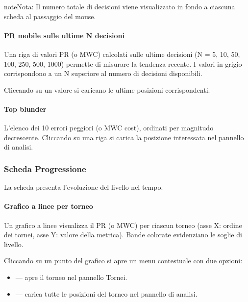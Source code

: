 \documentclass[letterpaper,10pt,italian]{sphinxmanual}
\begin{document}
\begin{sphinxadmonition}{note}{Nota:}
\sphinxAtStartPar
Il numero totale di decisioni viene visualizzato in fondo a ciascuna scheda al passaggio del mouse.
\end{sphinxadmonition}


\paragraph{PR mobile sulle ultime N decisioni}
\label{\detokenize{manuel:pr-glissant-sur-n-dernieres-decisions}}
\sphinxAtStartPar
Una riga di valori PR (o MWC) calcolati sulle ultime  decisioni (N = 5, 10, 50, 100, 250, 500, 1000) permette di misurare la tendenza recente. I valori in grigio corrispondono a un N superiore al numero di decisioni disponibili.

\sphinxAtStartPar
Cliccando su un valore si caricano le ultime  posizioni corrispondenti.


\paragraph{Top blunder}
\label{\detokenize{manuel:top-blunders}}
\sphinxAtStartPar
L’elenco dei 10 errori peggiori (o MWC cost), ordinati per magnitudo decrescente. Cliccando su una riga si carica la posizione interessata nel pannello di analisi.


\subsubsection{Scheda Progressione}
\label{\detokenize{manuel:onglet-progression}}
\sphinxAtStartPar
La scheda  presenta l’evoluzione del livello nel tempo.


\paragraph{Grafico a linee per torneo}
\label{\detokenize{manuel:courbe-par-tournoi}}
\sphinxAtStartPar
Un grafico a linee visualizza il PR (o MWC) per ciascun torneo (asse X: ordine dei tornei, asse Y: valore della metrica). Bande colorate evidenziano le soglie di livello.

\sphinxAtStartPar
Cliccando su un punto del grafico si apre un menu contestuale con due opzioni:
\begin{itemize}
\item {} 
\sphinxAtStartPar
{} — apre il torneo nel pannello Tornei.

\item {} 
\sphinxAtStartPar
{} — carica tutte le posizioni del torneo nel pannello di analisi.

\end{itemize}
\end{document}
